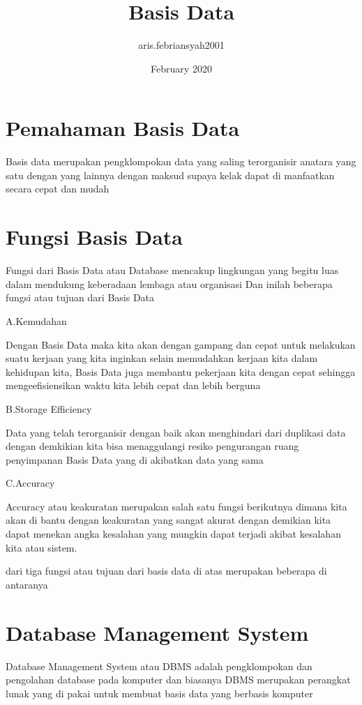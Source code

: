 \documentclass{article}
\title{Basis Data}
\author{aris.febriansyah2001 }
\date{February 2020}
\begin{document}
\maketitle

\section{Pemahaman Basis Data}
Basis data merupakan pengklompokan  data yang saling terorganisir anatara yang satu dengan yang lainnya dengan maksud supaya kelak dapat di manfaatkan secara cepat dan mudah 

\section{Fungsi Basis Data}
Fungsi dari Basis Data atau Database mencakup lingkungan yang begitu luas dalam mendukung keberadaan lembaga atau organisasi
Dan inilah beberapa fungsi atau tujuan dari Basis Data

 A.Kemudahan 
 
 Dengan Basis Data maka kita akan dengan gampang dan cepat untuk melakukan suatu kerjaan yang kita inginkan selain memudahkan kerjaan kita dalam kehidupan kita, Basis Data juga membantu pekerjaan kita dengan cepat sehingga mengeefisiensikan waktu kita lebih cepat dan lebih berguna
 
 B.Storage Efficiency
 
 Data yang telah terorganisir dengan baik akan menghindari dari duplikasi data dengan demkikian kita bisa menaggulangi resiko pengurangan ruang penyimpanan Basis Data yang di akibatkan data yang sama 
 
 C.Accuracy
 
 Accuracy atau keakuratan merupakan salah satu fungsi berikutnya dimana kita akan di bantu dengan keakuratan yang sangat akurat dengan demikian kita dapat menekan angka kesalahan yang mungkin dapat terjadi akibat kesalahan kita atau sistem.
 
 dari tiga fungsi atau tujuan dari basis data di atas merupakan beberapa di antaranya 
 
 \section{Database Management System}
 Database Management System atau DBMS adalah pengklompokan dan pengolahan database pada komputer dan biasanya DBMS merupakan perangkat lunak yang di pakai untuk membuat basis data yang berbasis komputer 
\end{document}
